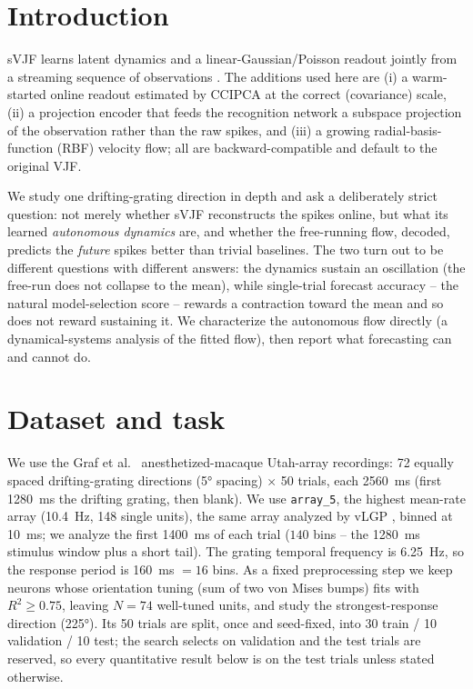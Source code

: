 \documentclass{article}
\newcommand{\svjf}{sVJF}
\begin{document}
\section{Introduction}
\svjf{} learns latent dynamics and a linear-Gaussian/Poisson readout jointly from a streaming
sequence of observations \cite{Zhao2017c}. The additions used here are (i) a warm-started
online readout estimated by CCIPCA at the correct (covariance) scale, (ii) a projection
encoder that feeds the recognition network a subspace projection of the observation rather
than the raw spikes, and (iii) a growing radial-basis-function (RBF) velocity flow; all are
backward-compatible and default to the original VJF.

We study one drifting-grating direction in depth and ask a deliberately strict question: not
merely whether \svjf{} reconstructs the spikes online, but what its learned \emph{autonomous
dynamics} are, and whether the free-running flow, decoded, predicts the \emph{future} spikes
better than trivial baselines. The two turn out to be different questions with different
answers: the dynamics sustain an oscillation (the free-run does not collapse to the mean), while
single-trial forecast accuracy -- the natural model-selection score -- rewards a contraction
toward the mean and so does not reward sustaining it. We characterize the autonomous flow
directly (a dynamical-systems analysis of the fitted flow), then report what forecasting can and
cannot do.

\section{Dataset and task}
We use the Graf et al.\ \cite{Graf2011-si} anesthetized-macaque Utah-array recordings:
72 equally spaced drifting-grating directions (\ang{5} spacing) $\times$ 50 trials, each
\SI{2560}{ms} (first \SI{1280}{ms} the drifting grating, then blank). We use
\texttt{array\_5}, the highest mean-rate array (\SI{10.4}{Hz}, 148 single units), the same
array analyzed by vLGP \cite{Zhao2016a}, binned at \SI{10}{ms}; we analyze the first \SI{1400}{ms} of
each trial ($140$ bins -- the \SI{1280}{ms} stimulus window plus a short tail). The grating
temporal frequency is \SI{6.25}{Hz}, so the response period is \SI{160}{ms} $=16$ bins. As a fixed preprocessing
step we keep neurons whose orientation tuning (sum of two von Mises bumps) fits with
$R^2\!\ge\!0.75$, leaving $N=74$ well-tuned units, and study the strongest-response
direction (\ang{225}). Its 50 trials are split, once and seed-fixed, into 30 train / 10
validation / 10 test; the search selects on validation and the test trials are reserved, so
every quantitative result below is on the test trials unless stated otherwise.
\end{document}
